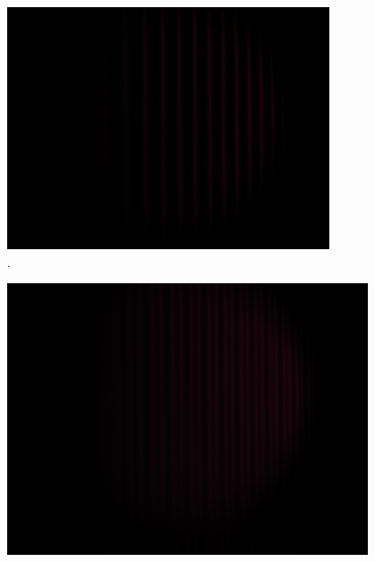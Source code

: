 \newpage
{}
\label{sec:Anhang}

\begin{figure}[h!]
  \centering
  \includegraphics[width=0.85\textwidth]{data/temp/rot_ohneB_0.JPG}
  \caption{\cite{insert Beschriftung}.}
  \label{fig:rotOhneB0}
\end{figure}
\begin{figure}[h!]
  \centering
  \includegraphics[width=0.95\textwidth]{data/temp/rot_mitB_0.JPG}
  \caption{\cite{insert Beschriftung 2}}
  \label{fig:rotMitB0}
\end{figure}

